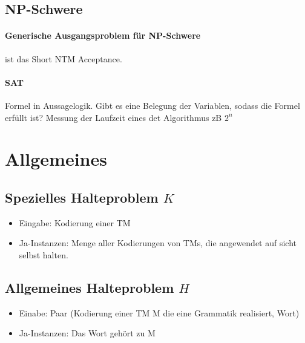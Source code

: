\documentclass[ngerman]{scrartcl}
\begin{document}
\subsection{NP-Schwere}
\paragraph{Generische Ausgangsproblem für NP-Schwere} ist das Short NTM Acceptance. 
\paragraph{SAT} Formel in Aussagelogik. Gibt es eine Belegung der Variablen, sodass die Formel erfüllt ist? Messung der Laufzeit eines det Algorithmus zB $ 2^n $










\section{Allgemeines}
\subsection{Spezielles Halteproblem $ K $}
\begin{itemize}
    \item Eingabe: Kodierung einer TM
    \item Ja-Instanzen: Menge aller Kodierungen von TMs, die angewendet auf sicht selbst halten.
\end{itemize}

\subsection{Allgemeines Halteproblem $ H $}
\begin{itemize}
    \item Einabe: Paar (Kodierung einer TM M die eine Grammatik realisiert, Wort)
    \item Ja-Instanzen: Das Wort gehört zu M
\end{itemize}
\end{document}
